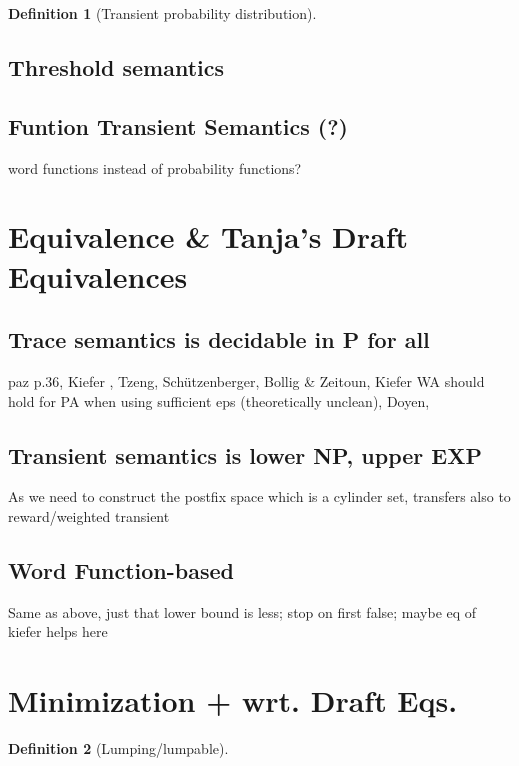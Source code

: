 \documentclass{article} %
\newtheorem{definition}{Definition}[section]
\begin{document}
            \begin{definition}[Transient probability distribution]
            \end{definition}
           
        
        \subsection{Threshold semantics}
            
        
        \subsection{Funtion Transient Semantics (?)}
        word functions instead of probability functions?
           
        
        \section{Equivalence \& Tanja's Draft Equivalences}
        
        \subsection{Trace semantics is decidable in P for all}
                paz p.36, Kiefer  , Tzeng, Schützenberger, Bollig \& Zeitoun, Kiefer WA should hold for PA when using sufficient eps (theoretically unclean), Doyen, 
            
        \subsection{Transient semantics is lower NP, upper EXP}
            As we need to construct the postfix space which is a cylinder set, transfers also to reward/weighted transient
            
        \subsection{Word Function-based}
            Same as above, just that lower bound is less; stop on first false; maybe eq of kiefer helps here
                
        
            
     
    \section{Minimization + wrt. Draft Eqs.}
        \begin{definition}[Lumping/lumpable]
         
        \end{definition}
\end{document}
